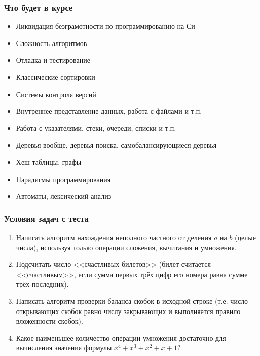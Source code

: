 \documentclass[xetex,mathserif,serif]{beamer}
\begin{document}
    \begin{frame}
        \frametitle{Что будет в курсе}
        \begin{itemize}
            \item Ликвидация безграмотности по программированию на Си
            \item Сложность алгоритмов
            \item Отладка и тестирование
            \item Классические сортировки
            \item Системы контроля версий
            \item Внутреннее представление данных, работа с файлами и т.п.
            \item Работа с указателями, стеки, очереди, списки и т.п.
            \item Деревья вообще, деревья поиска, самобалансирующиеся деревья
            \item Хеш-таблицы, графы
            \item Парадигмы программирования
            \item Автоматы, лексический анализ
        \end{itemize}
    \end{frame}

    \begin{frame}
        \frametitle{Условия задач с теста}
        \begin{enumerate}
            \item Написать алгоритм нахождения неполного частного от деления $a$ на $b$ (целые числа), используя только операции сложения, вычитания и умножения.
            \item Подсчитать число <<счастливых билетов>> (билет считается <<счастливым>>, если сумма первых трёх цифр его номера равна сумме трёх последних).
            \item Написать алгоритм проверки баланса скобок в исходной строке (т.е. число открывающих скобок равно числу закрывающих и выполняется правило вложенности скобок).
            \item Какое наименьшее количество операции умножения достаточно для вычисления значения формулы $x^4 + x^3 + x^2 + x + 1$?
        \end{enumerate}
    \end{frame}
\end{document}
